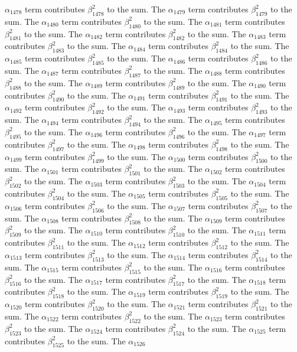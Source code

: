 \begin{lemma}
$\alpha_{1478}$ term contributes $\beta_{1478}^{2}$ to the sum. The $\alpha_{1479}$ term contributes $\beta_{1479}^{2}$ to the sum. The $\alpha_{1480}$ term contributes $\beta_{1480}^{2}$ to the sum. The $\alpha_{1481}$ term contributes $\beta_{1481}^{2}$ to the sum. The $\alpha_{1482}$ term contributes $\beta_{1482}^{2}$ to the sum. The $\alpha_{1483}$ term contributes $\beta_{1483}^{2}$ to the sum. The $\alpha_{1484}$ term contributes $\beta_{1484}^{2}$ to the sum. The $\alpha_{1485}$ term contributes $\beta_{1485}^{2}$ to the sum. The $\alpha_{1486}$ term contributes $\beta_{1486}^{2}$ to the sum. The $\alpha_{1487}$ term contributes $\beta_{1487}^{2}$ to the sum. The $\alpha_{1488}$ term contributes $\beta_{1488}^{2}$ to the sum. The $\alpha_{1489}$ term contributes $\beta_{1489}^{2}$ to the sum. The $\alpha_{1490}$ term contributes $\beta_{1490}^{2}$ to the sum. The $\alpha_{1491}$ term contributes $\beta_{1491}^{2}$ to the sum. The $\alpha_{1492}$ term contributes $\beta_{1492}^{2}$ to the sum. The $\alpha_{1493}$ term contributes $\beta_{1493}^{2}$ to the sum. The $\alpha_{1494}$ term contributes $\beta_{1494}^{2}$ to the sum. The $\alpha_{1495}$ term contributes $\beta_{1495}^{2}$ to the sum. The $\alpha_{1496}$ term contributes $\beta_{1496}^{2}$ to the sum. The $\alpha_{1497}$ term contributes $\beta_{1497}^{2}$ to the sum. The $\alpha_{1498}$ term contributes $\beta_{1498}^{2}$ to the sum. The $\alpha_{1499}$ term contributes $\beta_{1499}^{2}$ to the sum. The $\alpha_{1500}$ term contributes $\beta_{1500}^{2}$ to the sum. The $\alpha_{1501}$ term contributes $\beta_{1501}^{2}$ to the sum. The $\alpha_{1502}$ term contributes $\beta_{1502}^{2}$ to the sum. The $\alpha_{1503}$ term contributes $\beta_{1503}^{2}$ to the sum. The $\alpha_{1504}$ term contributes $\beta_{1504}^{2}$ to the sum. The $\alpha_{1505}$ term contributes $\beta_{1505}^{2}$ to the sum. The $\alpha_{1506}$ term contributes $\beta_{1506}^{2}$ to the sum. The $\alpha_{1507}$ term contributes $\beta_{1507}^{2}$ to the sum. The $\alpha_{1508}$ term contributes $\beta_{1508}^{2}$ to the sum. The $\alpha_{1509}$ term contributes $\beta_{1509}^{2}$ to the sum. The $\alpha_{1510}$ term contributes $\beta_{1510}^{2}$ to the sum. The $\alpha_{1511}$ term contributes $\beta_{1511}^{2}$ to the sum. The $\alpha_{1512}$ term contributes $\beta_{1512}^{2}$ to the sum. The $\alpha_{1513}$ term contributes $\beta_{1513}^{2}$ to the sum. The $\alpha_{1514}$ term contributes $\beta_{1514}^{2}$ to the sum. The $\alpha_{1515}$ term contributes $\beta_{1515}^{2}$ to the sum. The $\alpha_{1516}$ term contributes $\beta_{1516}^{2}$ to the sum. The $\alpha_{1517}$ term contributes $\beta_{1517}^{2}$ to the sum. The $\alpha_{1518}$ term contributes $\beta_{1518}^{2}$ to the sum. The $\alpha_{1519}$ term contributes $\beta_{1519}^{2}$ to the sum. The $\alpha_{1520}$ term contributes $\beta_{1520}^{2}$ to the sum. The $\alpha_{1521}$ term contributes $\beta_{1521}^{2}$ to the sum. The $\alpha_{1522}$ term contributes $\beta_{1522}^{2}$ to the sum. The $\alpha_{1523}$ term contributes $\beta_{1523}^{2}$ to the sum. The $\alpha_{1524}$ term contributes $\beta_{1524}^{2}$ to the sum. The $\alpha_{1525}$ term contributes $\beta_{1525}^{2}$ to the sum. The $\alpha_{1526}$ 
\end{lemma}
